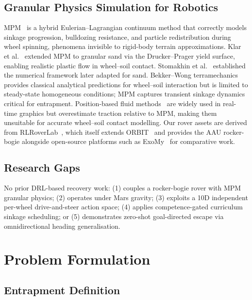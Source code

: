 \documentclass[conference]{IEEEtran}
\begin{document}
\subsection{Granular Physics Simulation for Robotics}

MPM~\cite{sulsky1994particle} is a hybrid Eulerian--Lagrangian continuum method
that correctly models sinkage progression, bulldozing resistance, and particle
redistribution during wheel spinning, phenomena invisible to rigid-body terrain
approximations. Klar et al.~\cite{klar2016sand} extended MPM to granular sand
via the Drucker--Prager yield surface, enabling realistic plastic flow in
wheel--soil contact. Stomakhin et al.~\cite{stomakhin2013snow} established the
numerical framework later adapted for sand. Bekker--Wong
terramechanics~\cite{bekker1960} provides classical analytical predictions for
wheel--soil interaction but is limited to steady-state homogeneous conditions;
MPM captures transient sinkage dynamics critical for entrapment. Position-based
fluid methods~\cite{macklin2014pbd} are widely used in real-time graphics but
overestimate traction relative to MPM, making them unsuitable for accurate
wheel--soil contact modelling. Our rover assets are derived from
RLRoverLab~\cite{rlroverlab}, which itself extends ORBIT~\cite{mittal2023orbit}
and provides the AAU rocker-bogie alongside open-source platforms such as
ExoMy~\cite{voellmy2020exomy} for comparative work.

\subsection{Research Gaps}

No prior DRL-based recovery work: (1) couples a rocker-bogie rover with MPM
granular physics; (2) operates under Mars gravity; (3) exploits a 10D
independent per-wheel drive-and-steer action space; (4) applies
competence-gated curriculum sinkage scheduling; or (5) demonstrates zero-shot
goal-directed escape via omnidirectional heading generalisation.

\enlargethispage{-3\baselineskip}

\section{Problem Formulation}
\label{sec:problem}

\subsection{Entrapment Definition}
\end{document}
